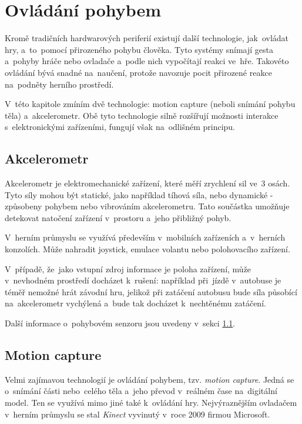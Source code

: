\documentclass[thesis=B,czech,hidelinks]{FITthesis}[2012/06/26] %
\begin{document}
\section{Ovládání pohybem}

Kromě tradičních hardwarových periferií existují další technologie, jak~ovládat hry, a~to~pomocí přirozeného pohybu člověka. Tyto systémy snímají gesta a~pohyby hráče nebo ovladače a~podle nich vypočítají reakci ve~hře. Takovéto ovládání bývá snadné na~naučení, protože navozuje pocit přirozené reakce na~podněty herního prostředí.

V~této kapitole zmíním dvě technologie: motion capture (neboli snímání pohybu těla) a~akcelerometr. Obě tyto technologie silně rozšířují možnosti interakce s~elektronickými zařízeními, fungují však na~odlišném principu.

\subsection{Akcelerometr}
\label{section:accelerometer}

Akcelerometr je elektromechanické zařízení, které měří zrychlení sil ve~3 osách. Tyto síly mohou být statické, jako například tíhová síla, nebo dynamické - způsobeny pohybem nebo vibrováním akcelerometru.\cite{acc} Tato součástka umožňuje detekovat natočení zařízení v~prostoru a~jeho přibližný pohyb.

V~herním průmyslu se využívá především v~mobilních zařízeních a~v~herních konzolích. Může nahradit joystick, emulace volantu nebo polohovacího zařízení. 

V~případě, že~jako vstupní zdroj informace je poloha zařízení, může v~nevhodném prostředí docházet k~rušení: například při~jízdě v~autobuse je téměř nemožné hrát závodní hru, jelikož při zatáčení autobusu bude síla působící na~akcelerometr vychýlená a~bude tak docházet k~nechtěnému zatáčení.

Další informace o~pohybovém senzoru jsou uvedeny v~sekci \ref{section:accelerometer}.

\subsection{Motion capture}
\label{section:motion_capture}

Velmi zajímavou technologií je ovládání pohybem, tzv. \textit{motion capture}. Jedná se o~snímání části nebo~celého těla a~jeho převod v~reálném čase na~digitální model. Ten se využívá mimo jiné také k~ovládání hry. Nejvýraznějším ovladačem v~herním průmyslu se stal \textit{Kinect} vyvinutý v~roce 2009 firmou Microsoft. \cite{meetthekinect}
\end{document}
